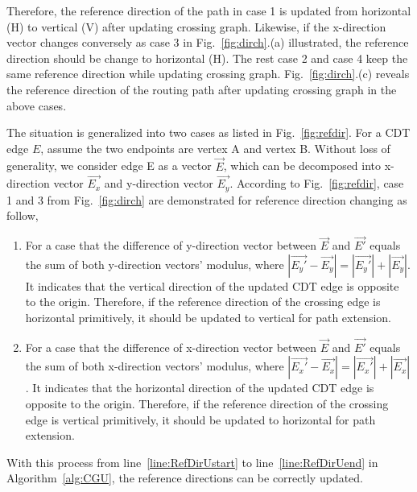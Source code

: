       Therefore, the reference direction of the path in case 1 is updated from horizontal (H) to vertical (V) after updating crossing graph. Likewise, if the x-direction vector changes conversely as case 3 in Fig.~\ref{fig:dirch}.(a) illustrated, the reference direction should be change to horizontal (H). The rest case 2 and case 4 keep the same reference direction while updating crossing graph. Fig.~\ref{fig:dirch}.(c) reveals the reference direction of the routing path after updating crossing graph in the above cases.

      The situation is generalized into two cases as listed in Fig.~\ref{fig:refdir}.
      For a CDT edge $E$, assume the two endpoints are vertex A and vertex B. Without loss of generality, we consider edge E as a vector $\overrightarrow{E}$, which can be decomposed into x-direction vector $\overrightarrow{E_x}$ and y-direction vector $\overrightarrow{E_y}$. According to Fig.~\ref{fig:refdir}, case 1 and 3 from Fig.~\ref{fig:dirch} are demonstrated for reference direction changing as follow, 


      \begin{enumerate}
        \item For a case that the difference of y-direction vector between $\overrightarrow{E}$ and $\overrightarrow{E'}$ equals the sum of both y-direction vectors' modulus, where $|\overrightarrow{E_y'} - \overrightarrow{E_y}|=|\overrightarrow{E_y'}|+|\overrightarrow{E_y}|$. It indicates that the vertical direction of the updated CDT edge is opposite to the origin. Therefore, if the reference direction of the crossing edge is horizontal primitively, it should be updated to vertical for path extension.
        \item For a case that the difference of x-direction vector between $\overrightarrow{E}$ and $\overrightarrow{E'}$ equals the sum of both x-direction vectors' modulus, where $|\overrightarrow{E_x'} - \overrightarrow{E_x}|=|\overrightarrow{E_x'}|+|\overrightarrow{E_x}|$. It indicates that the horizontal direction of the updated CDT edge is opposite to the origin. Therefore, if the reference direction of the crossing edge is vertical primitively, it should be updated to horizontal for path extension.
      \end{enumerate}


      With this process from line~\ref{line:RefDirUstart} to line~\ref{line:RefDirUend} in Algorithm~\ref{alg:CGU}, the reference directions can be correctly updated.

